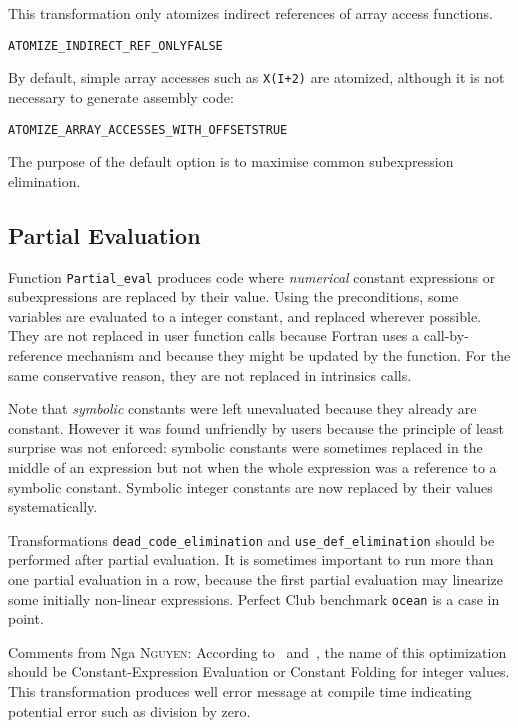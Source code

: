 \documentclass[a4paper]{report}
\newenvironment{PipsProp}{\begin{alltt}}{\end{alltt}}
\begin{document}
This transformation only atomizes indirect references of array access
functions.

\begin{PipsProp}
ATOMIZE_INDIRECT_REF_ONLY FALSE
\end{PipsProp}

By default, simple array accesses such as \verb/X(I+2)/ are atomized,
although it is not necessary to generate assembly code:

\begin{PipsProp}
ATOMIZE_ARRAY_ACCESSES_WITH_OFFSETS TRUE
\end{PipsProp}

The purpose of the default option is to maximise common subexpression
elimination.


\subsection{Partial Evaluation}
\label{sec:partial-evaluation}

Function \verb+Partial_eval+ produces code where {\em numerical} constant
expressions or subexpressions are replaced by their value. Using the
preconditions, some variables are evaluated to a integer constant, and
replaced wherever possible. They are not replaced in user function calls
because Fortran uses a call-by-reference mechanism and because they might
be updated by the function. For the same conservative reason, they are not
replaced in intrinsics calls.

Note that {\em symbolic} constants were left unevaluated because they
already are constant. However it was found unfriendly by users because the
principle of least surprise was not enforced: symbolic constants were
sometimes replaced in the middle of an expression but not when the whole
expression was a reference to a symbolic constant. Symbolic integer
constants are now replaced by their values systematically.

Transformations \verb/dead_code_elimination/ and \verb/use_def_elimination/ should be
performed after partial evaluation. It is sometimes important to run
more than one partial evaluation in a row, because the first partial
evaluation may linearize some initially non-linear expressions. Perfect
Club benchmark {\tt ocean} is a case in point.

Comments from Nga \textsc{Nguyen}: According to~\cite{Aho86} and~\cite{Much97}, the
name of this optimization should be Constant-Expression Evaluation or
Constant Folding for integer values. This transformation produces well
error message at compile time indicating potential error such as division
by zero. 
\end{document}
